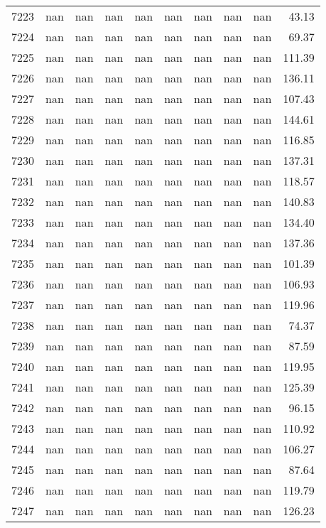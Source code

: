 \begin{tabular}{lrrrrrrrrr}
7223 & nan & nan & nan & nan & nan & nan & nan & nan & 43.13 \\
7224 & nan & nan & nan & nan & nan & nan & nan & nan & 69.37 \\
7225 & nan & nan & nan & nan & nan & nan & nan & nan & 111.39 \\
7226 & nan & nan & nan & nan & nan & nan & nan & nan & 136.11 \\
7227 & nan & nan & nan & nan & nan & nan & nan & nan & 107.43 \\
7228 & nan & nan & nan & nan & nan & nan & nan & nan & 144.61 \\
7229 & nan & nan & nan & nan & nan & nan & nan & nan & 116.85 \\
7230 & nan & nan & nan & nan & nan & nan & nan & nan & 137.31 \\
7231 & nan & nan & nan & nan & nan & nan & nan & nan & 118.57 \\
7232 & nan & nan & nan & nan & nan & nan & nan & nan & 140.83 \\
7233 & nan & nan & nan & nan & nan & nan & nan & nan & 134.40 \\
7234 & nan & nan & nan & nan & nan & nan & nan & nan & 137.36 \\
7235 & nan & nan & nan & nan & nan & nan & nan & nan & 101.39 \\
7236 & nan & nan & nan & nan & nan & nan & nan & nan & 106.93 \\
7237 & nan & nan & nan & nan & nan & nan & nan & nan & 119.96 \\
7238 & nan & nan & nan & nan & nan & nan & nan & nan & 74.37 \\
7239 & nan & nan & nan & nan & nan & nan & nan & nan & 87.59 \\
7240 & nan & nan & nan & nan & nan & nan & nan & nan & 119.95 \\
7241 & nan & nan & nan & nan & nan & nan & nan & nan & 125.39 \\
7242 & nan & nan & nan & nan & nan & nan & nan & nan & 96.15 \\
7243 & nan & nan & nan & nan & nan & nan & nan & nan & 110.92 \\
7244 & nan & nan & nan & nan & nan & nan & nan & nan & 106.27 \\
7245 & nan & nan & nan & nan & nan & nan & nan & nan & 87.64 \\
7246 & nan & nan & nan & nan & nan & nan & nan & nan & 119.79 \\
7247 & nan & nan & nan & nan & nan & nan & nan & nan & 126.23 \\

\end{tabular}

